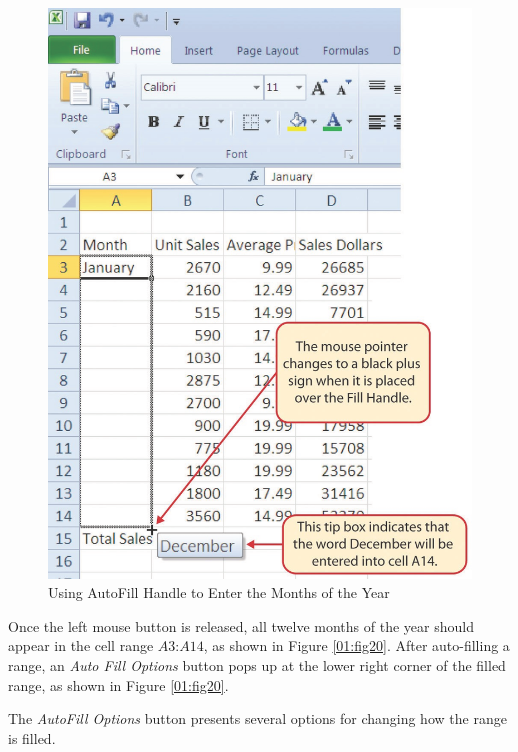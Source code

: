\begin{figure}[H]
	\centering
	\includegraphics[width=\maxwidth{.95\linewidth}]{gfx/ch01_fig19}
	\caption{Using AutoFill Handle to Enter the Months of the Year}
	\label{01:fig19}
\end{figure}

Once the left mouse button is released, all twelve months of the year should appear in the cell range $ A3 $:$ A14 $, as shown in Figure \ref{01:fig20}. After auto-filling a range, an \textit{Auto Fill Options} button pops up at the lower right corner of the filled range, as shown in Figure \ref{01:fig20}. 

 The \textit{AutoFill Options} button presents several options for changing how the range is filled.

